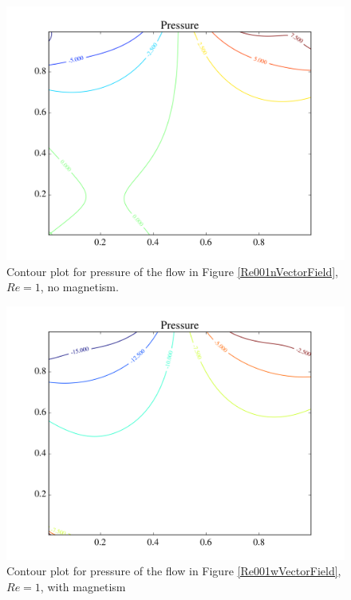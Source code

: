 \documentclass[journal]{IEEEtran}
\begin{document}
\begin{figure}[!t]
\centering
\includegraphics[width=\linewidth]{figures/Re001/n/pressure}
\caption{Contour plot for pressure of the flow in Figure \ref{Re001nVectorField}, $\mathit{Re}=1$, no magnetism. \label{Re001nPressure}}
\end{figure}

\begin{figure}[!t]
\centering
\includegraphics[width=\linewidth]{figures/Re001/w/pressure}
\caption{Contour plot for pressure of the flow in Figure \ref{Re001wVectorField}, $\mathit{Re}=1$, with magnetism\label{Re001wPressure}}
\end{figure}
\end{document}
